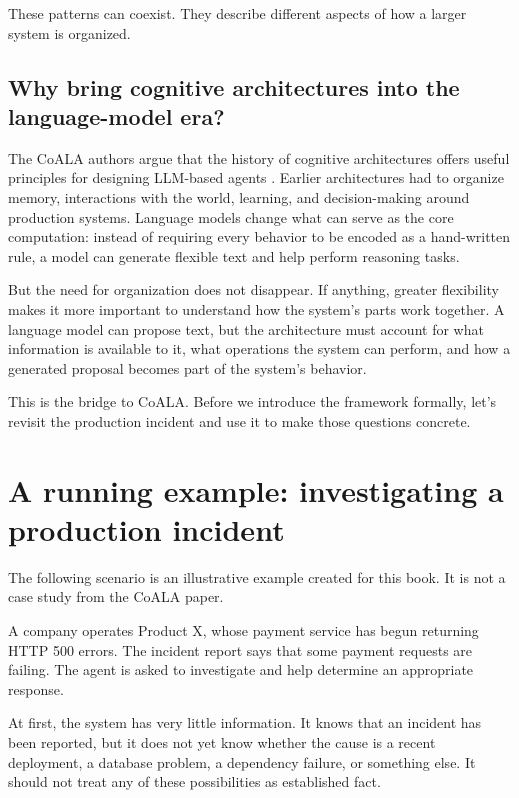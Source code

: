These patterns can coexist. They describe different aspects of how a larger system is organized.

\subsection{Why bring cognitive architectures into the language-model era?}\label{why-bring-cognitive-architectures-into-the-language-model-era}

The CoALA authors argue that the history of cognitive architectures offers useful principles for designing LLM-based agents . Earlier architectures had to organize memory, interactions with the world, learning, and decision-making around production systems. Language models change what can serve as the core computation: instead of requiring every behavior to be encoded as a hand-written rule, a model can generate flexible text and help perform reasoning tasks.

But the need for organization does not disappear. If anything, greater flexibility makes it more important to understand how the system's parts work together. A language model can propose text, but the architecture must account for what information is available to it, what operations the system can perform, and how a generated proposal becomes part of the system's behavior.

This is the bridge to CoALA. Before we introduce the framework formally, let's revisit the production incident and use it to make those questions concrete.

\section{A running example: investigating a production incident}\label{a-running-example-investigating-a-production-incident}

The following scenario is an illustrative example created for this book. It is not a case study from the CoALA paper.

A company operates Product X, whose payment service has begun returning HTTP 500 errors. The incident report says that some payment requests are failing. The agent is asked to investigate and help determine an appropriate response.

At first, the system has very little information. It knows that an incident has been reported, but it does not yet know whether the cause is a recent deployment, a database problem, a dependency failure, or something else. It should not treat any of these possibilities as established fact.

